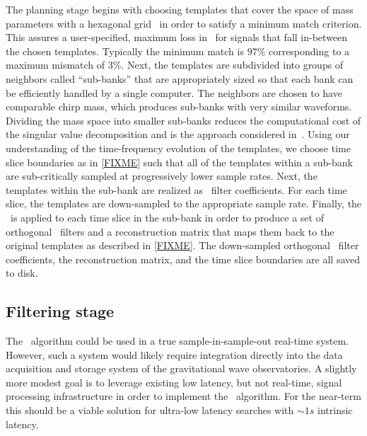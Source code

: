 The planning stage begins with choosing templates that cover the space of mass
parameters with a hexagonal grid~\cite{PhysRevD.76.102004} in order to satisfy
a minimum match criterion.  This assures a user-specified, maximum loss in \SNR\
for signals that fall in-between the chosen templates.  Typically the minimum
match is 97\% corresponding to a maximum mismatch of 3\%.  Next, the templates
are subdivided into groups of neighbors called ``sub-banks'' that are
appropriately sized so that each bank can be efficiently handled by a single
computer.  The neighbors are chosen to have comparable chirp mass, which produces
sub-banks with very similar waveforms.  Dividing the mass space into smaller
sub-banks reduces the computational cost of the singular value decomposition
and is the approach considered in~\cite{Cannon:2010p10398}.  Using our
understanding of the time-frequency evolution of the templates, we choose time
slice boundaries as in \eqref{FIXME} such that all of the templates within a
sub-bank are sub-critically sampled at progressively lower sample rates.  Next,
the templates within the sub-bank are realized as \fir\ filter
coefficients.  For each time slice, the templates are down-sampled to the
appropriate sample rate.  Finally, the \SVD\ is applied to each time
slice in the sub-bank in order to produce a set of orthogonal \fir\
filters and a reconstruction matrix that maps them back to the original
templates as described in \eqref{FIXME}.  The down-sampled orthogonal
\fir\ filter coefficients, the reconstruction matrix, and the time slice
boundaries are all saved to disk.

\subsection{Filtering stage}

The \lloid\ algorithm could be used in a true sample-in-sample-out real-time
system.  However, such a system would likely require integration directly into
the data acquisition and storage system of the gravitational wave
observatories.  A slightly more modest goal is to leverage existing low
latency, but not real-time, signal processing infrastructure in order to
implement the \lloid\ algorithm.  For the near-term this should be a viable 
solution for ultra-low latency searches with $\sim 1s$ intrinsic latency.

